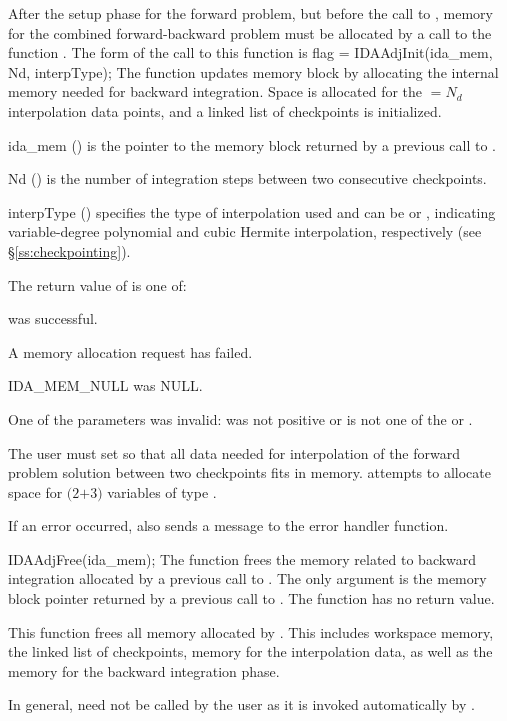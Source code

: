 After the setup phase for the forward problem, but before the call
to , memory for the combined forward-backward problem must be
allocated by a call to the function .
The form of the call to this function is
{
  flag = IDAAdjInit(ida\_mem, Nd, interpType);
}
{
  The function  updates {\idas} memory block by allocating 
  the internal memory needed for backward integration.
  Space is allocated for the  $= N_d$ interpolation data points, and
  a linked list of checkpoints is initialized.
}
{
  \begin{args}[interpType]
  \item[ida\_mem] () 
    is the pointer to the {\idas} memory block returned by a previous call
    to .
  \item[Nd] () 
    is the number of integration steps between two consecutive checkpoints.
  \item[interpType] ()
    specifies the type of interpolation used and can be 
    or , indicating variable-degree polynomial and cubic Hermite
    interpolation, respectively (see \S\ref{ss:checkpointing}).
  \end{args}
}
{
   The return value  of  is one of:
   \begin{args}
   \item[\Id{IDA\_SUCCESS}] 
      was successful.
   \item[\Id{IDA\_MEM\_FAIL}]
     A memory allocation request has failed.
   \item[IDA\_MEM\_NULL] 
      was NULL.
   \item[\Id{IDA\_ILL\_INPUT}]
     One of the parameters was invalid:  was not positive or 
     is not one of the  or .
   \end{args}
}
{
  The user must set  so that all data needed for interpolation of the 
  forward problem solution between two checkpoints fits in memory. 
  attempts to allocate space for $(2$$+3)$ variables of type .

  If an error occurred,  also sends a message to the
  error handler function.
}
{
  IDAAdjFree(ida\_mem);
}
{
  The function  frees the memory related to backward integration
  allocated by a previous call to .
}
{
  The only argument is the {\idas} memory block pointer returned by a previous call 
  to .
}
{
  The function  has no return value.
}
{
  This function frees all memory allocated by . This
  includes workspace memory, the linked list of checkpoints, memory
  for the interpolation data, as well as the {\idas} memory for the
  backward integration phase.

  In general,  need not be called by the user as it is
  invoked automatically by .
}

